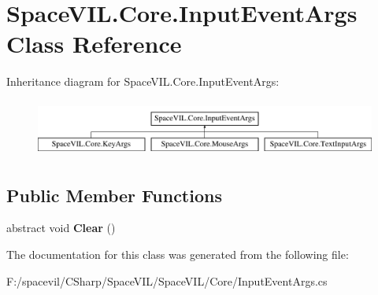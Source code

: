 \hypertarget{class_space_v_i_l_1_1_core_1_1_input_event_args}{}\section{Space\+V\+I\+L.\+Core.\+Input\+Event\+Args Class Reference}
\label{class_space_v_i_l_1_1_core_1_1_input_event_args}
Inheritance diagram for Space\+V\+I\+L.\+Core.\+Input\+Event\+Args\+:\begin{figure}[H]
\begin{center}
\leavevmode
\includegraphics[height=1.895093cm]{class_space_v_i_l_1_1_core_1_1_input_event_args}
\end{center}
\end{figure}
\subsection*{Public Member Functions}
\begin{DoxyCompactItemize}
\item 
\mbox{\label{class_space_v_i_l_1_1_core_1_1_input_event_args_ac8e757e62418b3d0ae057b93e3cae76c}} 
abstract void {\bfseries Clear} ()
\end{DoxyCompactItemize}


The documentation for this class was generated from the following file\+:\begin{DoxyCompactItemize}
\item 
F\+:/spacevil/\+C\+Sharp/\+Space\+V\+I\+L/\+Space\+V\+I\+L/\+Core/Input\+Event\+Args.\+cs\end{DoxyCompactItemize}
